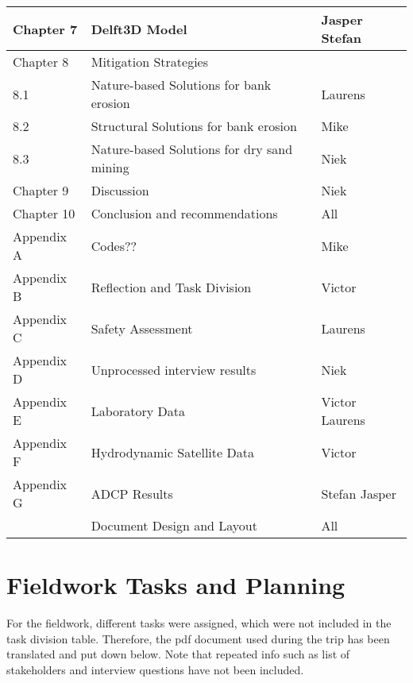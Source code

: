 \begin{table}[H]
    \setlength\extrarowheight{4pt}
    \centering
    \caption*{}
    \label{tab:taskdivision2}
    \begin{tabularx}{\textwidth}{lXX}
        \toprule
                Chapter 7 & Delft3D Model & Jasper Stefan\\
        \midrule
        Chapter 8 & Mitigation Strategies & \\
        8.1 & Nature-based Solutions for bank erosion & Laurens \\
        8.2 & Structural Solutions for bank erosion & Mike \\
        8.3 & Nature-based Solutions for dry sand mining & Niek \\
        \midrule
        Chapter 9 & Discussion & Niek \\
        \midrule
        Chapter 10 & Conclusion and recommendations & All \\
        \midrule
        Appendix A & Codes?? & Mike \\
        Appendix B & Reflection and Task Division & Victor \\
        Appendix C & Safety Assessment & Laurens \\
        Appendix D & Unprocessed interview results & Niek \\
        Appendix E & Laboratory Data & Victor Laurens \\
        Appendix F & Hydrodynamic Satellite Data & Victor \\
        Appendix G & ADCP Results & Stefan Jasper\\
        \midrule
        & Document Design and Layout & All \\
        \bottomrule
    \end{tabularx}
\end{table}

\section{Fieldwork Tasks and Planning}

For the fieldwork, different tasks were assigned, which were not included in the task division table. 
Therefore, the pdf document used during the trip has been translated and put down below.
Note that repeated info such as list of stakeholders and interview questions have not been included.


